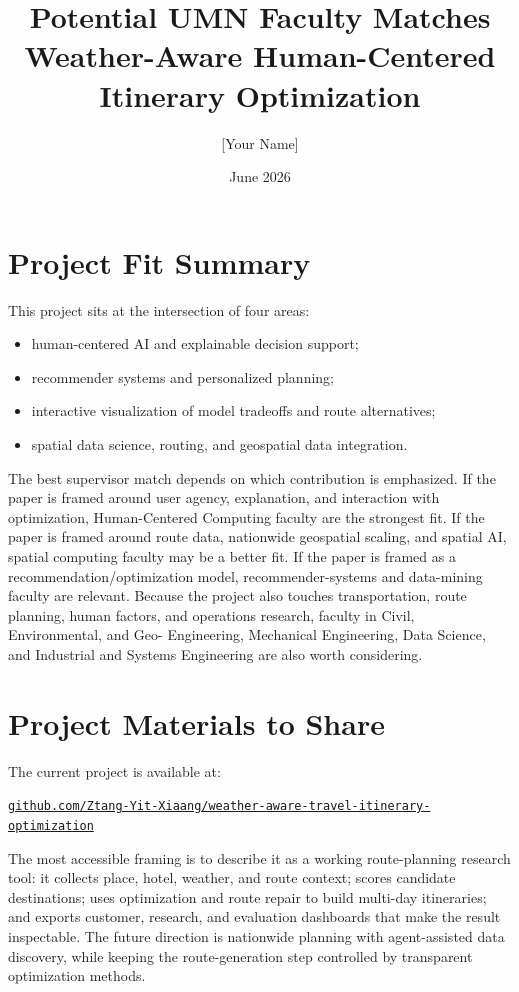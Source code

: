 \documentclass[11pt,a4paper]{article}
\title{\vspace{-1.2em}Potential UMN Faculty Matches\\
\large Weather-Aware Human-Centered Itinerary Optimization}
\author{[Your Name]}
\date{June 2026}
\begin{document}
\maketitle

\section*{Project Fit Summary}

\noindent This project sits at the intersection of four areas:

\begin{itemize}
    \item human-centered AI and explainable decision support;
    \item recommender systems and personalized planning;
    \item interactive visualization of model tradeoffs and route alternatives;
    \item spatial data science, routing, and geospatial data integration.
\end{itemize}

\noindent The best supervisor match depends on which contribution is emphasized. If the paper is framed around user agency, explanation, and interaction with optimization, Human-Centered Computing faculty are the strongest fit. If the paper is framed around route data, nationwide geospatial scaling, and spatial AI, spatial computing faculty may be a better fit. If the paper is framed as a recommendation/optimization model, recommender-systems and data-mining faculty are relevant. Because the project also touches transportation, route planning, human factors, and operations research, faculty in Civil, Environmental, and Geo- Engineering, Mechanical Engineering, Data Science, and Industrial and Systems Engineering are also worth considering.

\section*{Project Materials to Share}

\noindent The current project is available at:

\begin{center}
\href{https://github.com/Ztang-Yit-Xiaang/weather-aware-travel-itinerary-optimization}{\texttt{github.com/Ztang-Yit-Xiaang/weather-aware-travel-itinerary-optimization}}
\end{center}

\noindent The most accessible framing is to describe it as a working route-planning research tool: it collects place, hotel, weather, and route context; scores candidate destinations; uses optimization and route repair to build multi-day itineraries; and exports customer, research, and evaluation dashboards that make the result inspectable. The future direction is nationwide planning with agent-assisted data discovery, while keeping the route-generation step controlled by transparent optimization methods.
\end{document}
